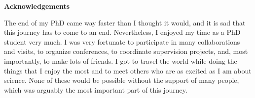 





\cleardoublepage
{}    %

\begin{center}\textbf{Acknowledgements}\end{center}


The end of my PhD came way faster than I thought it would, and it is sad that this journey has to come to an end. Nevertheless, I enjoyed my time as a PhD student very much. I was very fortunate to participate in many collaborations and visits, to organize conferences, to coordinate supervision projects, and, most importantly, to make lots of friends. I got to travel the world while doing the things that I enjoy the most and to meet others who are as excited as I am about science. None of these would be possible without the support of many people, which was arguably the most important part of this journey. 


